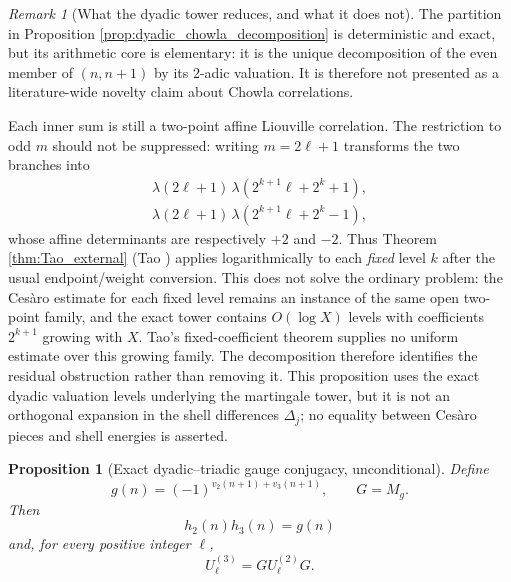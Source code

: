 \documentclass[11pt]{amsart}
\numberwithin{equation}{section}
\theoremstyle{plain}
\newtheorem{proposition}[theorem]{Proposition}
\theoremstyle{definition}
\theoremstyle{remark}
\newtheorem{remark}[theorem]{Remark}
\newcommand{\liou}{\lambda}
\begin{document}
\begin{remark}[What the dyadic tower reduces, and what it does not]
\label{rem:dyadic_tower_obstruction}
The partition in Proposition \ref{prop:dyadic_chowla_decomposition} is deterministic and exact, but its arithmetic core is elementary: it is the unique decomposition of the even member of $(n,n+1)$ by its $2$-adic valuation.  It is therefore not presented as a literature-wide novelty claim about Chowla correlations.

Each inner sum is still a two-point affine Liouville correlation.  The restriction to odd $m$ should not be suppressed: writing $m=2\ell+1$ transforms the two branches into
\begin{align}
\liou(2\ell+1)\,
\liou(2^{k+1}\ell+2^k+1),
\label{eq:dyadic_affine_plus}\\
\liou(2\ell+1)\,
\liou(2^{k+1}\ell+2^k-1),
\label{eq:dyadic_affine_minus}
\end{align}
whose affine determinants are respectively $+2$ and $-2$.  Thus Theorem \ref{thm:Tao_external} (Tao \cite{Tao2016}) applies logarithmically to each \emph{fixed} level $k$ after the usual endpoint/weight conversion.  This does not solve the ordinary problem: the Cesàro estimate for each fixed level remains an instance of the same open two-point family, and the exact tower contains $O(\log X)$ levels with coefficients $2^{k+1}$ growing with $X$.  Tao's fixed-coefficient theorem supplies no uniform estimate over this growing family.  The decomposition therefore identifies the residual obstruction rather than removing it.  This proposition uses the exact dyadic valuation levels underlying the martingale tower, but it is not an orthogonal expansion in the shell differences $\Delta_j$; no equality between Cesàro pieces and shell energies is asserted.
\end{remark}

\begin{proposition}[Exact dyadic--triadic gauge conjugacy, unconditional]
\label{prop:dyadic_triadic_conjugacy}
Define
\begin{equation}
g(n)=(-1)^{v_2(n+1)+v_3(n+1)},
\qquad G=M_g.
\label{eq:gauge_g_definition}
\end{equation}
Then
\begin{equation}
h_2(n)h_3(n)=g(n)
\label{eq:h2_h3_g}
\end{equation}
and, for every positive integer $\ell$,
\begin{equation}
U_\ell^{(3)}=G U_\ell^{(2)}G.
\label{eq:gauge_conjugacy}
\end{equation}
\end{proposition}
\end{document}
